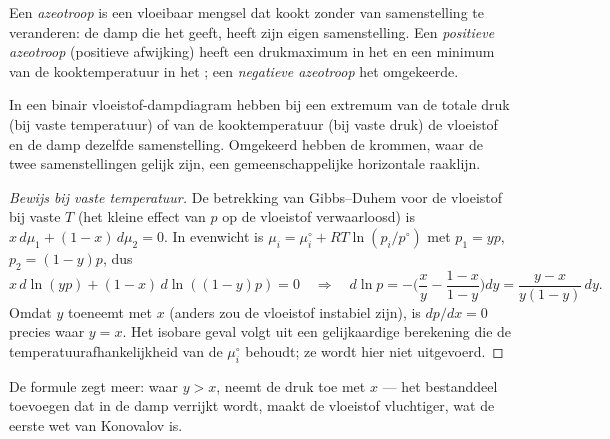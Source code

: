 \begin{definition}[Azeotroop]\label{def:b2:liquid-vapour-diagrams:azeotrope}
Een \emph{azeotroop} is een vloeibaar mengsel dat kookt zonder
van samenstelling te veranderen: de damp die het geeft, heeft zijn eigen samenstelling. Een
\emph{positieve azeotroop} (positieve afwijking) heeft
een drukmaximum in het  en een minimum van de kooktemperatuur
in het ; een \emph{negatieve azeotroop}
het omgekeerde.
\end{definition}

\begin{theorem}\label{thm:b2:liquid-vapour-diagrams:konovalov}
In een binair vloeistof-dampdiagram hebben bij een extremum van de totale druk (bij
vaste temperatuur) of van de kooktemperatuur (bij vaste druk) de
vloeistof en de damp dezelfde samenstelling. Omgekeerd hebben de krommen, waar de
twee samenstellingen gelijk zijn, een gemeenschappelijke horizontale raaklijn.
\end{theorem}

\begin{proof}[Bewijs bij vaste temperatuur]
De betrekking van Gibbs--Duhem voor de vloeistof bij vaste $T$ (het kleine effect van $p$
op de vloeistof verwaarloosd) is $x\,d\mu_1 + (1 - x)\,d\mu_2 = 0$. In evenwicht is
$\mu_i = \mu_i^\circ + RT\ln(p_i/p^\circ)$ met $p_1 = yp$, $p_2 = (1 - y)p$, dus
\[
  x\,d\ln(yp) + (1 - x)\,d\ln((1 - y)p) = 0
  \quad\Longrightarrow\quad
  d\ln p = -\Big(\frac{x}{y} - \frac{1 - x}{1 - y}\Big)dy
  = \frac{y - x}{y(1 - y)}\,dy .
\]
Omdat $y$ toeneemt met $x$ (anders zou de vloeistof instabiel zijn), is
$dp/dx = 0$ precies waar $y = x$. Het isobare geval volgt uit een gelijkaardige
berekening die de temperatuurafhankelijkheid van de $\mu_i^\circ$ behoudt; ze wordt
hier niet uitgevoerd.
\end{proof}

De formule zegt meer: waar $y > x$, neemt de druk toe met $x$ ---
het bestanddeel toevoegen dat in de damp verrijkt wordt, maakt de vloeistof
vluchtiger, wat de eerste wet van Konovalov is.

